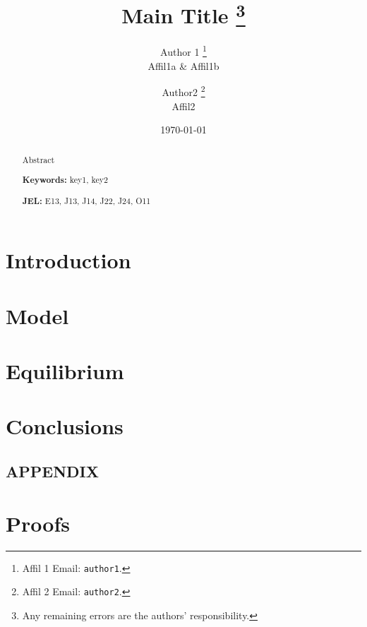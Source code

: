 \documentclass[a4paper, 12pt]{article}
\title{ Main Title
\thanks{
Any remaining errors are the authors' responsibility. 
	}
}
\author{ Author 1
		\thanks{ Affil 1
		Email: \texttt{author1}. } \\[-1pt]
{\small Affil1a \& Affil1b}
\and  Author2 
		\thanks{Affil 2 
		Email: \texttt{author2}. } \\[-1pt]
{\small Affil2 }\\[-7pt]
}
\date{\bigskip \bigskip \today}
\theoremstyle{definition}\newtheorem{definition}{Definition}
\theoremstyle{definition}\newtheorem{remark}{Remark}
\theoremstyle{theorem}\newtheorem{prop}{Proposition}
\theoremstyle{definition}\newtheorem{fact}{Fact}
\begin{document}
    \maketitle
   
   \begin{abstract}
       Abstract
       
   \textbf{Keywords:} key1, key2
   
   \textbf{JEL:}        E13, J13, J14, J22, J24, O11     
   \end{abstract}
      
\thispagestyle{empty}
\setcounter{page}{0}



\clearpage
\section{Introduction}
\section{Model}
\section{Equilibrium}
\section{Conclusions}


\clearpage

%


\clearpage

\appendix

\begin{center}
	\section*{APPENDIX}
\end{center}

\section{Proofs}














%
%
%
%
\end{document}
